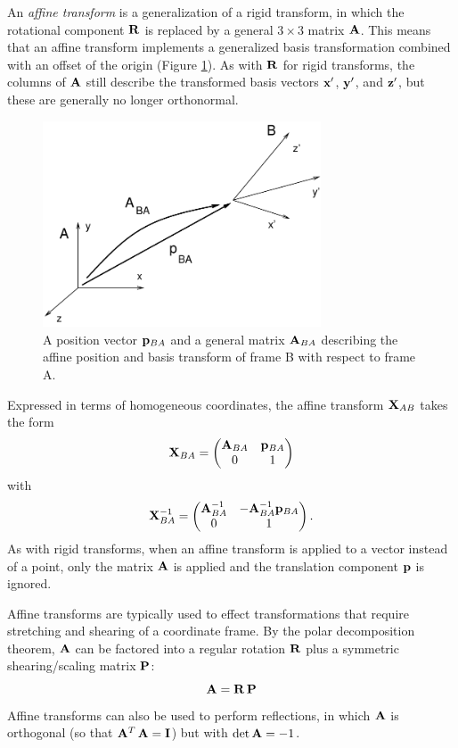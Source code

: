 An {\it affine transform} is a generalization of a rigid transform, in
which the rotational component $\R$ is replaced by a general $3 \times
3$ matrix $\A$. This means that an affine transform implements a
generalized basis transformation combined with an offset of the origin
(Figure \ref{affineAB:fig}). As with $\R$ for rigid transforms, the
columns of $\A$ still describe the transformed basis vectors $\x'$,
$\y'$, and $\z'$, but these are generally no longer orthonormal.

\begin{figure}[ht]
\begin{center}
 \includegraphics[width=3.25in]{images/affineAB}
\end{center}
\caption{A position vector $\p_{BA}$ and a general matrix $\A_{BA}$
describing the affine position and basis transform of frame B with respect to
frame A.}
\label{affineAB:fig}
\end{figure}

Expressed in terms of homogeneous coordinates,
the affine transform $\X_{AB}$ takes the form
%
\begin{equation}
\X_{BA} = \matl \A_{BA} & \p_{BA} \\ 0 & 1 \matr
\end{equation}
%
with
%
\begin{equation}
\X_{BA}^{-1} = \matl \A_{BA}^{-1} & -\A_{BA}^{-1} \p_{BA} \\ 0 & 1 \matr.
\end{equation}
%
As with rigid transforms, when an affine transform is applied to a
vector instead of a point, only the matrix $\A$ is applied and the
translation component $\p$ is ignored.

Affine transforms are typically used to effect transformations that
require stretching and shearing of a coordinate frame.  By the polar
decomposition theorem, $\A$ can be factored into a regular
rotation $\R$ plus a symmetric shearing/scaling matrix $\P$:
%
\begin{equation}
\A = \R \, \P
\end{equation}
%
Affine transforms can also be used to perform reflections, in which
$\A$ is orthogonal (so that $\A^T \, \A = \I$) but with $\det \A =
-1$.


